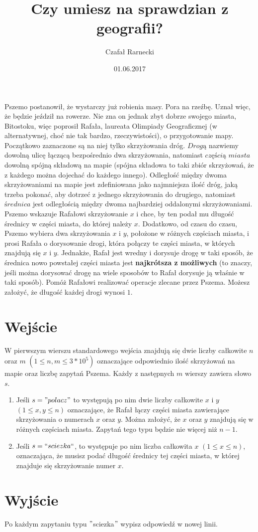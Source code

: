 \documentclass[zad,zawodnik,utf8]{sinol}
\title{Czy umiesz na sprawdzian z geografii?}
\author{Czafał Rarnecki} %
\date{01.06.2017}
\begin{document}
\begin{tasktext}

	Pszemo postanowił, że wystarczy już robienia masy. Pora na rzeźbę. Uznał więc, że będzie jeździł na rowerze. Nie zna on jednak zbyt dobrze swojego miasta, Bitostoku, więc poprosił Rafała, laureata Olimpiady Geograficznej (w alternatywnej, choć nie tak bardzo, rzeczywistości), o przygotowanie mapy. Początkowo zaznaczone są na niej tylko skrzyżowania dróg. $Drogą$ nazwiemy dowolną ulicę łączącą bezpośrednio dwa skrzyżowania, natomiast $częścią$ $miasta$ dowolną spójną składową na mapie (spójna składowa to taki zbiór skrzyżowań, że z każdego można dojechać do każdego innego). Odległość między dwoma skrzyżowaniami na mapie jest zdefiniowana jako najmniejsza ilość dróg, jaką trzeba pokonać, aby dotrzeć z jednego skrzyżowania do drugiego, natomiast $średnica$ jest odległością między dwoma najbardziej oddalonymi skrzyżowaniami. Pszemo wskazuje Rafałowi skrzyżowanie $x$ i chce, by ten podał mu długość średnicy w części miasta, do której należy $x$. Dodatkowo, od czasu do czasu, Pszemo wybiera dwa skrzyżowania $x$ i $y$, położone w różnych częściach miasta, i prosi Rafała o dorysowanie drogi, która połączy te części miasta, w których znajdują się $x$ i $y$. Jednakże, Rafał jest wredny i dorysuje drogę w taki sposób, że średnica nowo powstałej części miasta jest \textbf{najkrótsza z możliwych} (to znaczy, jeśli można dorysować drogę na wiele sposobów to Rafał dorysuje ją właśnie w taki sposób). Pomóż Rafałowi realizować operacje zlecane przez Pszema. Możesz założyć, że długość każdej drogi wynosi $1$.

  \section{Wejście}

	W pierwszym wierszu standardowego wejścia znajdują się dwie liczby całkowite $n$ oraz $m$ $(1 \leq n, m \leq 3*10^5)$ oznaczające odpowiednio ilość skrzyżowań na mapie oraz
liczbę zapytań Pszema. Każdy z następnych $m$ wierszy zawiera słowo $s$.
\begin{enumerate}
	\item Jeśli $s = "polacz"$ to występują po nim dwie liczby całkowite $x$ i $y$ $(1 \leq x, y \leq n)$ oznaczające, że Rafał łączy części miasta zawierające skrzyżowania o numerach $x$ oraz $y$. Można założyć, że $x$ oraz $y$ znajdują się w różnych częściach miasta. Zapytań tego typu będzie nie więcej niż $n - 1$.
	\item Jeśli $s = ``sciezka``$, to występuje po nim liczba całkowita $x$ $(1 \leq x \leq n)$, oznaczająca, że musisz podać długość średnicy tej części miasta, w której znajduje się skrzyżowanie numer $x$.
\end{enumerate}

	\section{Wyjście}
	
	Po każdym zapytaniu typu $"$sciezka$"$ wypisz odpowiedź w nowej linii.
\makecompactexample


\end{tasktext}
\end{document}
